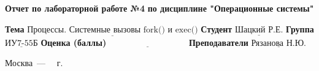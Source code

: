 \begin{titlepage}
	\begin{center}
		\noindent\begin{minipage}{1.3\textwidth}
					 \centering
					 \Large\textbf{  Отчет по лабораторной работе №4}\newline
					 \textbf{по дисциплине "Операционные системы"}\newline\newline
		\end{minipage}
	\end{center}

	\noindent\textbf{Тема} $\underline{\text{Процессы. Системные вызовы fork() и exec()}}$\newline\newline
	\noindent\textbf{Студент} $\underline{\text{Шацкий Р.Е.}}$\newline\newline
	\noindent\textbf{Группа} $\underline{\text{ИУ7-55Б}}$\newline\newline
	\noindent\textbf{Оценка (баллы)} $\underline{\text{~~~~~~~~~~~~~~~~~~~~~~~~~~~}}$\newline\newline
	\noindent\textbf{Преподаватели} $\underline{\text{Рязанова Н.Ю.}}$\newline\newline\newline

	\begin{center}
		\vfill
		Москва~---~\the\year
		~г.
	\end{center}
\end{titlepage}
